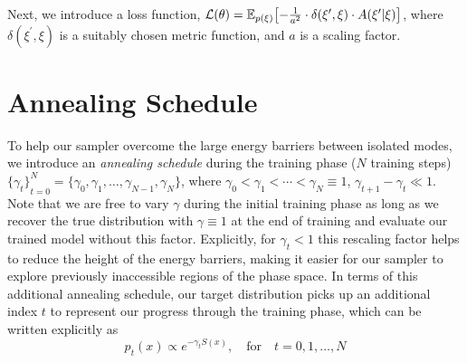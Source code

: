 \documentclass{article} %
\begin{document}
Next, we introduce a loss function, \(%
   \mathcal{L}(\theta) = \mathbb{E}_{p(\xi)}{%
      \left[-\tfrac{1}{a^{2}}\cdot\delta(\xi^{\prime}, \xi)\cdot A(\xi^{\prime}|\xi)\right]
   }
\), where \(\delta(\xi^{\prime},\xi)\) is a suitably chosen metric function, and \(a\) is a scaling factor.
%
%
\section{\label{sec:annealing}Annealing Schedule}
%
To help our sampler overcome the large energy barriers between isolated modes, we introduce an \emph{annealing schedule}
during the training phase (\(N\) training steps) \({\{\gamma_{t}\}}_{t=0}^{N} = \{\gamma_{0}, \gamma_{1}, \ldots,
\gamma_{N-1}, \gamma_{N}\}\), where \(\gamma_{0} < \gamma_{1} < \cdots < \gamma_{N} \equiv 1\), \(\gamma_{t+1} -
\gamma_{t} \ll 1\).
%
Note that we are free to vary \(\gamma\) during the initial training phase as long as we recover the true distribution
with \(\gamma \equiv 1\) at the end of training and evaluate our trained model without this factor.
%
Explicitly, for \(\gamma_{t} < 1\) this rescaling factor helps to reduce the height of the energy barriers, making it
easier for our sampler to explore previously inaccessible regions of the phase space.
%
In terms of this additional annealing schedule, our target distribution picks up an additional index \(t\) to represent
our progress through the training phase, which can be written explicitly as %
\begin{equation}
   p_{t}(x)\propto e^{-\gamma_{t} S(x)},\quad\text{for}\quad t=0, 1, \ldots, N
\end{equation}
%
\end{document}
